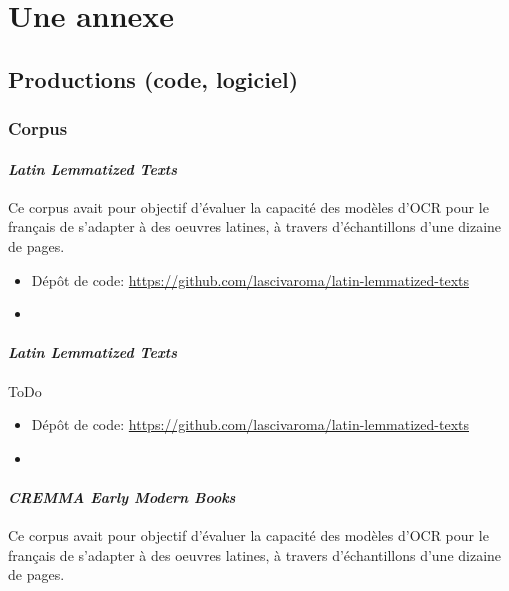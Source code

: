 \appendix

\chapter*{Une annexe}

\section*{Productions (code, logiciel)}

\subsection*{Corpus}

\subsubsection*{\textit{Latin Lemmatized Texts}}

Ce corpus avait pour objectif d'évaluer la capacité des modèles d'OCR pour le français de s'adapter à des oeuvres latines, à travers d'échantillons d'une dizaine de pages. 

\begin{itemize}
    \item Dépôt de code: \url{https://github.com/lascivaroma/latin-lemmatized-texts}
    \item \cite{Clerice_CREMMA_16_18_Prints_2021}
\end{itemize}

\subsubsection*{\textit{Latin Lemmatized Texts}}

ToDo

\begin{itemize}
    \item Dépôt de code: \url{https://github.com/lascivaroma/latin-lemmatized-texts}
    \item \cite{Clerice_CREMMA_16_18_Prints_2021}
\end{itemize}

\subsubsection*{\textit{CREMMA Early Modern Books}}

Ce corpus avait pour objectif d'évaluer la capacité des modèles d'OCR pour le français de s'adapter à des oeuvres latines, à travers d'échantillons d'une dizaine de pages. 

